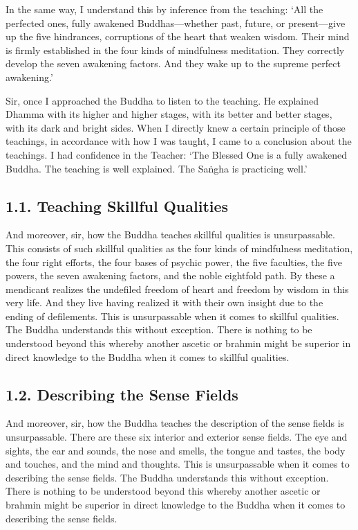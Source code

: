\documentclass[12pt,openany]{book}%
\begin{document}
In the same way, I understand this by inference from the teaching: ‘All the perfected ones, fully awakened Buddhas—whether past, future, or present—give up the five hindrances, corruptions of the heart that weaken wisdom. Their mind is firmly established in the four kinds of mindfulness meditation. They correctly develop the seven awakening factors. And they wake up to the supreme perfect awakening.’ 

Sir, once I approached the Buddha to listen to the teaching. He explained Dhamma with its higher and higher stages, with its better and better stages, with its dark and bright sides. When I directly knew a certain principle of those teachings, in accordance with how I was taught, I came to a conclusion about the teachings. I had confidence in the Teacher: ‘The Blessed One is a fully awakened Buddha. The teaching is well explained. The \textsanskrit{Saṅgha} is practicing well.’ 

\subsection*{1.1. Teaching Skillful Qualities }

And moreover, sir, how the Buddha teaches skillful qualities is unsurpassable. This consists of such skillful qualities as the four kinds of mindfulness meditation, the four right efforts, the four bases of psychic power, the five faculties, the five powers, the seven awakening factors, and the noble eightfold path. By these a mendicant realizes the undefiled freedom of heart and freedom by wisdom in this very life. And they live having realized it with their own insight due to the ending of defilements. This is unsurpassable when it comes to skillful qualities. The Buddha understands this without exception. There is nothing to be understood beyond this whereby another ascetic or brahmin might be superior in direct knowledge to the Buddha when it comes to skillful qualities. 

\subsection*{1.2. Describing the Sense Fields }

And moreover, sir, how the Buddha teaches the description of the sense fields is unsurpassable. There are these six interior and exterior sense fields. The eye and sights, the ear and sounds, the nose and smells, the tongue and tastes, the body and touches, and the mind and thoughts. This is unsurpassable when it comes to describing the sense fields. The Buddha understands this without exception. There is nothing to be understood beyond this whereby another ascetic or brahmin might be superior in direct knowledge to the Buddha when it comes to describing the sense fields. 
\end{document}
